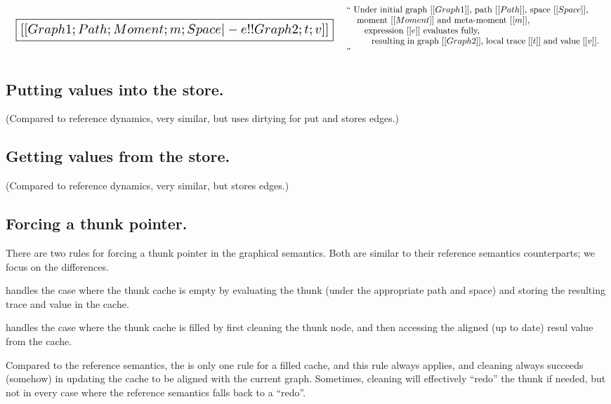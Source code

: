 \documentclass[11pt]{article}
\begin{document}
\[
\begin{array}{lc}
  {\scalebox{1.5}{
  \boxed{[[Graph1; Path; Moment; m; Space |- e !! Graph2; t; v]]}}}
&
\begin{array}{p{4in}}
  ``
  Under initial graph~$[[Graph1]]$,
  path~$[[Path]]$,
  space~$[[Space]]$,\\
  \hspace{3mm}~moment~$[[Moment]]$ and meta-moment~$[[m]]$,\\
  \hspace{6mm}~expression~$[[e]]$ evaluates fully,\\
  \hspace{9mm}~resulting in graph~$[[Graph2]]$, local trace~$[[t]]$ and value~$[[v]]$.
  ''
\end{array}
\end{array}
\]

\subsection{Putting values into the store.}

(Compared to reference dynamics, very similar, but uses dirtying for put and stores edges.)

\subsection{Getting values from the store.}

(Compared to reference dynamics, very similar, but stores edges.)

\subsection{Forcing a thunk pointer.}

There are two rules for forcing a thunk pointer in the graphical semantics.
%
Both are similar to their reference semantics counterparts; we focus on the differences.

 handles the case where the thunk cache is empty
by evaluating the thunk (under the appropriate path and space) and
storing the resulting trace and value in the cache.

 handles the case where the thunk cache is filled
by first cleaning the thunk node, and then accessing the aligned (up
to date) resul value from the cache.

Compared to the reference semantics, the is only one rule for a filled
cache, and this rule always applies, and cleaning always succeeds
(somehow) in updating the cache to be aligned with the current graph.
%
Sometimes, cleaning will effectively ``redo'' the thunk if needed, but
not in every case where the reference semantics falls back to a
``redo''.
\end{document}
